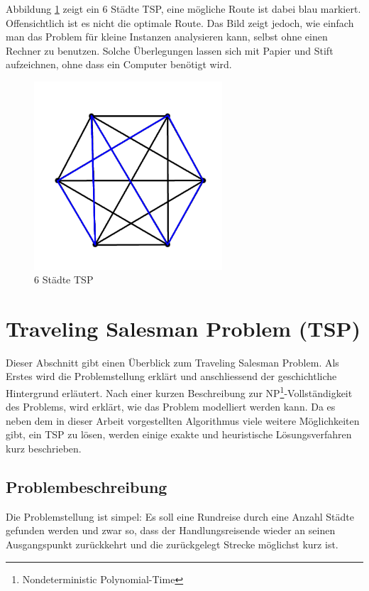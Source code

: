 \documentclass[11pt,a4paper]{article}
\begin{document}
Abbildung \ref{img:simple_tsp} zeigt ein 6 Städte TSP, eine mögliche Route ist dabei blau markiert. Offensichtlich ist es nicht die optimale Route. Das Bild zeigt jedoch, wie einfach man das Problem für kleine Instanzen analysieren kann, selbst ohne einen Rechner zu benutzen. Solche Überlegungen lassen sich mit Papier und Stift aufzeichnen, ohne dass ein Computer benötigt wird. 

\begin{figure}[H]
        \centering
        \includegraphics[width=7cm]{gfx/simple_tsp}
        \caption{6 Städte TSP}
        \label{img:simple_tsp}
\end{figure}

\newpage
\section{Traveling Salesman Problem (TSP)}
\label{s:traveling_salesman_problem}
Dieser Abschnitt gibt einen Überblick zum Traveling Salesman Problem. Als Erstes wird die Problemstellung erklärt und anschliessend der geschichtliche Hintergrund erläutert. Nach einer kurzen Beschreibung zur NP\footnote{Nondeterministic Polynomial-Time}-Vollständigkeit des Problems, wird erklärt, wie das Problem modelliert werden kann. Da es neben dem in dieser Arbeit vorgestellten Algorithmus viele weitere Möglichkeiten gibt, ein TSP zu lösen, werden einige exakte und heuristische Lösungsverfahren kurz beschrieben.

\subsection{Problembeschreibung}
Die Problemstellung ist simpel: Es soll eine Rundreise durch eine Anzahl Städte gefunden werden und zwar so, dass der Handlungsreisende wieder an seinen Ausgangspunkt zurückkehrt und die zurückgelegt Strecke möglichst kurz ist.
\end{document}
